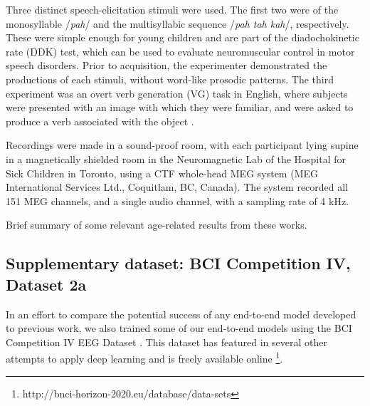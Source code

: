 \documentclass[utf8]{frontiersSCNS} %
\begin{document}

Three distinct speech-elicitation stimuli were used. The first two were of the monosyllable /{\em pah}/ and the multisyllabic sequence /{\em pah tah kah}/, respectively. These were simple enough for young children and are part of the diadochokinetic rate (DDK) test, which can be used to evaluate neuromuscular control in motor speech disorders. Prior to acquisition, the experimenter demonstrated the productions of each stimuli, without word-like prosodic patterns. The third experiment was an overt verb generation (VG) task in English, where subjects were presented with an image with which they were familiar, and were asked to produce a verb associated with the object \cite{Doesburg2016}.

Recordings were made in a sound-proof room, with each participant lying supine in a magnetically shielded room in the Neuromagnetic Lab of the Hospital for Sick Children in Toronto, using a CTF whole-head MEG system (MEG International Services Ltd., Coquitlam, BC, Canada). The system recorded all 151 MEG channels, and a single audio channel, with a sampling rate of 4 kHz.

Brief summary of some relevant age-related results from these works.

\subsection{Supplementary dataset: BCI Competition IV, Dataset 2a}

In an effort to compare the potential success of any end-to-end model developed to previous work, we also trained some of our end-to-end models using the BCI Competition IV EEG Dataset \cite{Tangermann2012}. This dataset has featured in several other attempts to apply deep learning and is freely available online \footnote{http://bnci-horizon-2020.eu/database/data-sets}.
\end{document}
